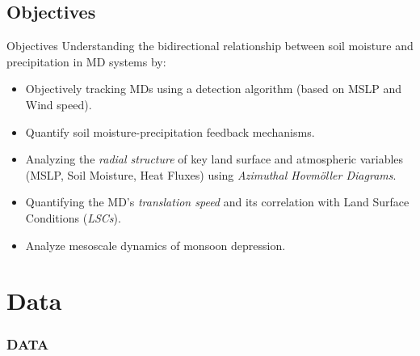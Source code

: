 \documentclass[aspectratio=169,t,xcolor=table]{beamer}
\begin{document}
\subsection{Objectives}
\begin{frame}{Objectives}
	\footnotesize
	Understanding the bidirectional relationship between soil moisture and precipitation in MD systems by:
	\begin{itemize}
		\item Objectively tracking MDs using a detection algorithm (based on MSLP and Wind speed).
		\item Quantify soil moisture-precipitation feedback mechanisms.
		\item Analyzing the \textit{radial structure} of key land surface and atmospheric variables (MSLP, Soil Moisture, Heat Fluxes) using \textit{Azimuthal Hovm\"oller Diagrams}.
		\item Quantifying the MD's \textit{translation speed} and its correlation with Land Surface Conditions (\textit{LSCs}).
		\item Analyze mesoscale dynamics of monsoon depression.
	\end{itemize}
\end{frame}

\section{Data}
\begin{frame}{}
	\frametitle{DATA}
\end{frame}
\end{document}
